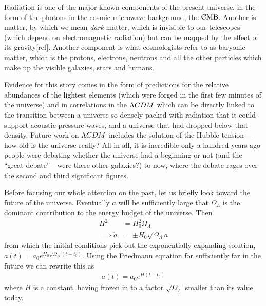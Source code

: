     Radiation is one of the major known components of the present universe, in the form of the
    photons in the cosmic microwave background, the $\text{CMB}$. Another is matter, by which we mean \textit{dark} matter,
    which is invisible to our telescopes (which depend on electromagnetic radiation) but can be mapped by the
    effect of its gravity[ref]. Another component is what cosmologists refer to as baryonic matter, which is
    the protons, electrons, neutrons and all the other particles which make up the visible galaxies, stars
    and humans.


    Evidence for this story comes in the form of predictions for the relative abundances of the lightest
    elements (which were forged in the first few minutes of the universe) and in correlations in the $\Lambda CDM$
    which can be directly linked to the transition between a universe so densely packed with radiation that it could
    support acoustic pressure waves, and a universe that had dropped below that density.
    Future work on $\Lambda CDM$ includes the solution of the Hubble tension---how old is the universe really?
    All in all, it is incredible only a hundred years ago people were debating whether the universe had a beginning or not
    (and the ``great debate''---were there other galaxies?) to now, where the debate rages over the second and third significant
    figures.


    Before focusing our whole attention on the past, let us briefly
    look toward the future of the universe. Eventually $a$ will be
    sufficiently large that $\Omega_{\Lambda}$
    is the dominant contribution to the energy budget of the universe.
    Then
    \begin{align}
        H^2 &= H_0^2\Omega_{\Lambda}\\
        \implies \dot{a} &= \pm H_0\sqrt{\Omega_{\Lambda}}a
    \end{align}
    from which the initial conditions pick out the exponentially expanding solution,\\
    ${a(t)=a_0e^{H_0\sqrt{\Omega_{\Lambda}}\left(t-t_0\right)}}$. Using the Friedmann equation
    for sufficiently far in the future we can rewrite this as
    \begin{align}
        a(t)=a_0e^{H\left(t-t_0\right)}
    \end{align}
    where $H$ is a constant, having frozen in to a factor $\sqrt{\Omega_{\Lambda}}$ smaller than
    its value today.


